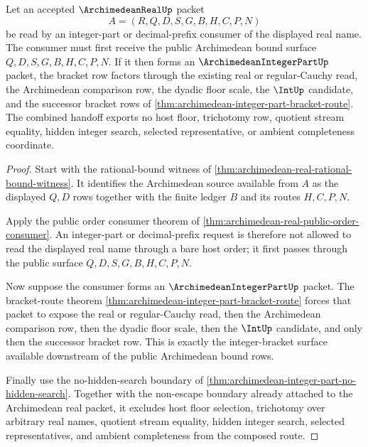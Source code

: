 \begin{theorem}
\label{thm:archimedean-real-integer-bracket}
Let an accepted $\ArchimedeanRealUp$ packet
$$
A=(R,Q,D,S,G,B,H,C,P,N)
$$
be read by an integer-part or decimal-prefix consumer of the displayed real name. The consumer must first receive the public Archimedean bound surface $Q,D,S,G,B,H,C,P,N$. If it then forms an $\ArchimedeanIntegerPartUp$ packet, the bracket row factors through the existing real or regular-Cauchy read, the Archimedean comparison row, the dyadic floor scale, the $\IntUp$ candidate, and the successor bracket rows of \autoref{thm:archimedean-integer-part-bracket-route}. The combined handoff exports no host floor, trichotomy row, quotient stream equality, hidden integer search, selected representative, or ambient completeness coordinate.
\end{theorem}
\begin{proof}
Start with the rational-bound witness of \autoref{thm:archimedean-real-rational-bound-witness}. It identifies the Archimedean source available from $A$ as the displayed $Q,D$ rows together with the finite ledger $B$ and its routes $H,C,P,N$.

Apply the public order consumer theorem of \autoref{thm:archimedean-real-public-order-consumer}. An integer-part or decimal-prefix request is therefore not allowed to read the displayed real name through a bare host order; it first passes through the public surface $Q,D,S,G,B,H,C,P,N$.

Now suppose the consumer forms an $\ArchimedeanIntegerPartUp$ packet. The bracket-route theorem \autoref{thm:archimedean-integer-part-bracket-route} forces that packet to expose the real or regular-Cauchy read, then the Archimedean comparison row, then the dyadic floor scale, then the $\IntUp$ candidate, and only then the successor bracket row. This is exactly the integer-bracket surface available downstream of the public Archimedean bound rows.

Finally use the no-hidden-search boundary of \autoref{thm:archimedean-integer-part-no-hidden-search}. Together with the non-escape boundary already attached to the Archimedean real packet, it excludes host floor selection, trichotomy over arbitrary real names, quotient stream equality, hidden integer search, selected representatives, and ambient completeness from the composed route.
\end{proof}

